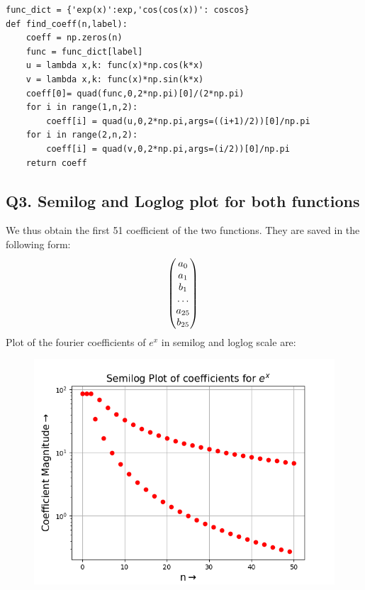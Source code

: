 \documentclass{article}
\begin{document}
\begin{lstlisting}
func_dict = {'exp(x)':exp,'cos(cos(x))': coscos}
def find_coeff(n,label):
    coeff = np.zeros(n)
    func = func_dict[label]
    u = lambda x,k: func(x)*np.cos(k*x)
    v = lambda x,k: func(x)*np.sin(k*x)
    coeff[0]= quad(func,0,2*np.pi)[0]/(2*np.pi)
    for i in range(1,n,2):
        coeff[i] = quad(u,0,2*np.pi,args=((i+1)/2))[0]/np.pi
    for i in range(2,n,2):
        coeff[i] = quad(v,0,2*np.pi,args=(i/2))[0]/np.pi
    return coeff
\end{lstlisting}




\subsection*{Q3. Semilog and Loglog plot for both functions}
We thus obtain the first 51 coefficient of the two functions. They are saved in the following form:
\[
\begin{pmatrix}
	a_0 \\
	a_1 \\
	b_1 \\
	\dots \\
	a_{25} \\
	b_{25}
\end{pmatrix}\\
\]
\newline
Plot of the fourier coefficients of $e^x$
in semilog and loglog scale are:
\begin{figure}[h!]
	\centering
	\includegraphics[scale=0.46]{q3(a)}
	\label{fig:1(b)}
\end{figure}
\end{document}
